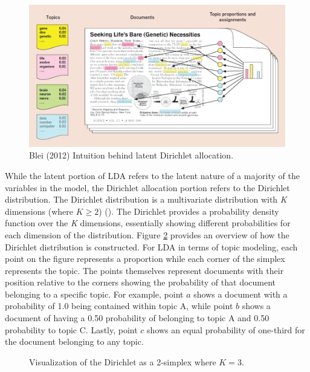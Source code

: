 \documentclass[a4paper, 12pt, twoside]{article}
\numberwithin{equation}{section} %
\begin{document}
\begin{figure}[h]
\includegraphics[scale=0.65]{Topic_Model_Intuition.png}
\centering
\caption[LDA visualization]{Blei (2012) Intuition behind latent Dirichlet allocation.}
\label{blei-intuition}
\end{figure}

While the latent portion of LDA refers to the latent nature of a majority of the variables in the model, the Dirichlet allocation portion refers to the Dirichlet distribution. The Dirichlet distribution is a multivariate distribution with \textit{K} dimensions (where $K \geq 2$) (\cite{kotz2000}). The Dirichlet provides a probability density function over the \textit{K} dimensions, essentially showing different probabilities for each dimension of the distribution.  Figure \ref{2simplex} provides an overview of how the Dirichlet distribution is constructed. For LDA in terms of topic modeling, each point on the figure represents a proportion while each corner of the simplex represents the topic. The points themselves represent documents with their position relative to the corners showing the probability of that document belonging to a specific topic. For example, point $a$ shows a document with a probability of 1.0 being contained within topic A, while point $b$ shows a document of having a 0.50 probability of belonging to topic A and 0.50 probability to topic C. Lastly, point $c$ shows an equal probability of one-third for the document belonging to any topic.

\begin{figure}[h]
\centering
{}
\caption[LDA visualization as simplex]{Visualization of the Dirichlet as a 2-simplex where $K = 3$.}
\label{2simplex}
\end{figure}
\end{document}
